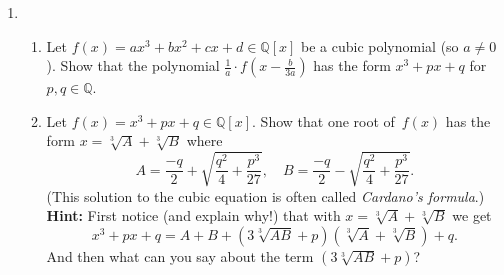 \documentclass[11pt]{article}
\begin{document}
\begin{enumerate}
\item \begin{enumerate}
\item Let $f(x) = ax^3+bx^2+cx+d \in \mathbb{Q}[x]$ be a cubic polynomial (so $a \neq 0$). Show that the polynomial $\frac{1}{a} \cdot f(x-\frac{b}{3a})$ has the form $x^3+px+q$ for $p,q\in \mathbb{Q}$.
\item Let $f(x) = x^3+px+q\in \mathbb{Q}[x]$. Show that one root of~$f(x)$ has the form $x=\sqrt[3]{A}+\sqrt[3]{B}$ where 
\[ A = \frac{-q}{2} + \sqrt{\frac{q^2}{4}+\frac{p^3}{27}}, \quad B = \frac{-q}{2} - \sqrt{\frac{q^2}{4}+\frac{p^3}{27}}.\]
(This solution to the cubic equation is often called \emph{Cardano's formula}.) \\
{\bf Hint:} First notice (and explain why!) that with $x=\sqrt[3]{A}+\sqrt[3]{B}$ we get 
\[ x^3+px+q = A+B+(3\sqrt[3]{AB}+p)(\sqrt[3]{A}+\sqrt[3]{B})+q.\]
And then what can you say about the term $(3\sqrt[3]{AB}+p)$?
\end{enumerate}

\end{enumerate}
\end{document}
